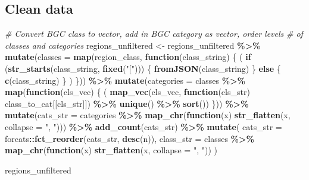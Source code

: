 \documentclass[
]{article}
\newenvironment{Shaded}{\begin{snugshade}}{\end{snugshade}}
\newcommand{\AttributeTok}[1]{\textcolor[rgb]{0.13,0.29,0.53}{#1}}
\newcommand{\CommentTok}[1]{\textcolor[rgb]{0.56,0.35,0.01}{\textit{#1}}}
\newcommand{\ControlFlowTok}[1]{\textcolor[rgb]{0.13,0.29,0.53}{\textbf{#1}}}
\newcommand{\FunctionTok}[1]{\textcolor[rgb]{0.13,0.29,0.53}{\textbf{#1}}}
\newcommand{\NormalTok}[1]{#1}
\newcommand{\OtherTok}[1]{\textcolor[rgb]{0.56,0.35,0.01}{#1}}
\newcommand{\SpecialCharTok}[1]{\textcolor[rgb]{0.81,0.36,0.00}{\textbf{#1}}}
\newcommand{\StringTok}[1]{\textcolor[rgb]{0.31,0.60,0.02}{#1}}
\begin{document}
\hypertarget{clean-data}{%
\subsection{Clean data}\label{clean-data}}

\begin{Shaded}
\begin{Highlighting}[]
\CommentTok{\# Convert BGC \textquotesingle{}class\textquotesingle{} to vector, add in BGC \textquotesingle{}category\textquotesingle{} as vector, order levels }
\CommentTok{\# of classes and categories}
\NormalTok{regions\_unfiltered }\OtherTok{\textless{}{-}}\NormalTok{ regions\_unfiltered }\SpecialCharTok{\%\textgreater{}\%}
  \FunctionTok{mutate}\NormalTok{(}\AttributeTok{classes =} \FunctionTok{map}\NormalTok{(region\_class, }\ControlFlowTok{function}\NormalTok{(class\_string) \{}
\NormalTok{    (}
      \ControlFlowTok{if}\NormalTok{ (}\FunctionTok{str\_starts}\NormalTok{(class\_string, }\FunctionTok{fixed}\NormalTok{(}\StringTok{"["}\NormalTok{))) \{}
        \FunctionTok{fromJSON}\NormalTok{(class\_string)}
\NormalTok{      \} }\ControlFlowTok{else}\NormalTok{ \{}
        \FunctionTok{c}\NormalTok{(class\_string)}
\NormalTok{      \}}
\NormalTok{    )}
\NormalTok{  \})) }\SpecialCharTok{\%\textgreater{}\%}
  \FunctionTok{mutate}\NormalTok{(}\AttributeTok{categories =}\NormalTok{ classes }\SpecialCharTok{\%\textgreater{}\%} \FunctionTok{map}\NormalTok{(}\ControlFlowTok{function}\NormalTok{(cls\_vec) \{}
\NormalTok{    (}
      \FunctionTok{map\_vec}\NormalTok{(cls\_vec, }\ControlFlowTok{function}\NormalTok{(cls\_str) class\_to\_cat[[cls\_str]]) }\SpecialCharTok{\%\textgreater{}\%} \FunctionTok{unique}\NormalTok{() }\SpecialCharTok{\%\textgreater{}\%} \FunctionTok{sort}\NormalTok{())}
\NormalTok{  \})) }\SpecialCharTok{\%\textgreater{}\%}
  \FunctionTok{mutate}\NormalTok{(}\AttributeTok{cats\_str =}\NormalTok{ categories }\SpecialCharTok{\%\textgreater{}\%} \FunctionTok{map\_chr}\NormalTok{(}\ControlFlowTok{function}\NormalTok{(x) }\FunctionTok{str\_flatten}\NormalTok{(x, }\AttributeTok{collapse =} \StringTok{", "}\NormalTok{))) }\SpecialCharTok{\%\textgreater{}\%}
  \FunctionTok{add\_count}\NormalTok{(cats\_str) }\SpecialCharTok{\%\textgreater{}\%}
  \FunctionTok{mutate}\NormalTok{(}
    \AttributeTok{cats\_str =}\NormalTok{ forcats}\SpecialCharTok{::}\FunctionTok{fct\_reorder}\NormalTok{(cats\_str, }\FunctionTok{desc}\NormalTok{(n)),}
    \AttributeTok{class\_str =}\NormalTok{ classes }\SpecialCharTok{\%\textgreater{}\%} \FunctionTok{map\_chr}\NormalTok{(}\ControlFlowTok{function}\NormalTok{(x) }\FunctionTok{str\_flatten}\NormalTok{(x, }\AttributeTok{collapse =} \StringTok{", "}\NormalTok{))}
\NormalTok{  )}

\NormalTok{regions\_unfiltered}
\end{Highlighting}
\end{Shaded}
\end{document}
